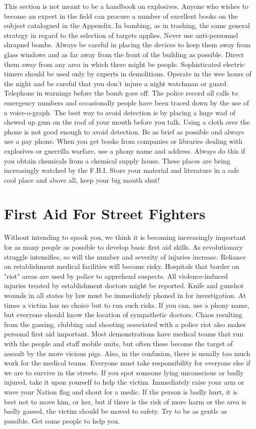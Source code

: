 \documentclass[11pt,twoside,a4paper]{book}
\begin{document}
	This section is not meant to be a handbook on explosives. Anyone who wishes to become an expert in the field can procure a number of excellent books on the subject catalogued in the Appendix. In bombing, as in trashing, the same general strategy in regard to the selection of targets applies. Never use anti-personnel shrapnel bombs. Always be careful in placing the devices to keep them away from glass windows and as far away from the front of the building as possible. Direct them away from any area in which there might be people. Sophisticated electric timers should be used only by experts in demolitions. Operate in the wee hours of the night and be careful that you don't injure a night watchman or guard. Telephone in warnings before the bomb goes off. The police record all calls to emergency numbers and occasionally people have been traced down by the use of a voice-o-graph. The best way to avoid detection is by placing a huge wad of chewed up gum on the roof of your mouth before you talk. Using a cloth over the phone is not good enough to avoid detection. Be as brief as possible and always use a pay phone. When you get books from companies or libraries dealing with explosives or guerrilla warfare, use a phony name and address. Always do this if you obtain chemicals from a chemical supply house. These places are being increasingly watched by the F.B.I. Store your material and literature in a safe cool place and above all, keep your big mouth shut! 


\section{First Aid For Street Fighters}

Without intending to spook you, we think it is becoming increasingly important for as many people as possible to develop basic first aid skills. As revolutionary struggle intensifies, so will the number and severity of injuries increase. Reliance on establishment medical facilities will become risky. Hospitals that border on "riot" areas are used by police to apprehend suspects. All violence-induced injuries treated by establishment doctors might be reported. Knife and gunshot wounds in all states by law must be immediately phoned in for investigation. At times a victim has no choice but to run such risks. If you can, use a phony name, but everyone should know the location of sympathetic doctors.  Chaos resulting from the gassing, clubbing and shooting associated with a police riot also makes personal first aid important. Most demonstrations have medical teams that run with the people and staff mobile units, but often these become the target of assault by the more vicious pigs. Also, in the confusion, there is usually too much work for the medical teams. Everyone must take responsibility for everyone else if we are to survive in the streets. If you spot someone lying unconscious or badly injured, take it upon yourself to help the victim. Immediately raise your arm or wave your Nation flag and shout for a medic. If the person is badly hurt, it is best not to move him, or her, but if there is the risk of more harm or the area is badly gassed, the victim should be moved to safety. Try to be as gentle as possible. Get some people to help you.
\end{document}
